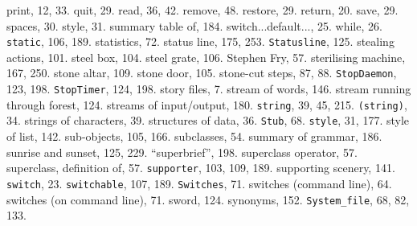 \quad  print, 12, 33.
\quad  quit, 29.
\quad  read, 36, 42.
\quad  remove, 48.
\quad  restore, 29.
\quad  return, 20.
\quad  save, 29.
\quad  spaces, 30.
\quad  style, 31.
\quad  summary table of, 184.
\quad  switch...default..., 25.
\quad  while, 26.
{{\tt static}}, 106, 189.
statistics, 72.
status line, 175, 253.
{{\tt Statusline}}, 125.
stealing actions, 101.
steel box, 104.
steel grate, 106.
Stephen Fry, 57.
sterilising machine, 167, 250.
stone altar, 109.
stone door, 105.
stone-cut steps, 87, 88.
{{\tt StopDaemon}}, 123, 198.
{{\tt StopTimer}}, 124, 198.
story files, 7.
stream of words, 146.
stream running through forest, 124.
streams of input/output, 180.
{{\tt string}}, 39, 45, 215.
{{\tt (string)}}, 34.
strings of characters, 39.
structures of data, 36.
{{\tt Stub}}, 68.
{{\tt style}}, 31, 177.
style of list, 142.
sub-objects, 105, 166.
subclasses, 54.
summary of grammar, 186.
sunrise and sunset, 125, 229.
``superbrief'', 198.
superclass operator, 57.
superclass, definition of, 57.
{{\tt supporter}}, 103, 109, 189.
supporting scenery, 141.
{{\tt switch}}, 23.
{{\tt switchable}}, 107, 189.
{{\tt Switches}}, 71.
switches (command line), 64.
switches (on command line), 71.
sword, 124.
synonyms, 152.
{{\tt System\_file}}, 68, 82, 133.

